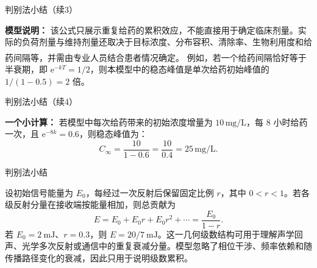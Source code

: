 \documentclass[aspectratio=169,10pt,fontset=fandol]{ctexbeamer}
\newcommand{\ee}{\mathrm{e}}
\newcommand{\upcite}[1]{\textsuperscript{\textsuperscript{\cite{#1}}}}
\begin{document}
\begin{frame}[t,fragile]{判别法小结（续3）}
\footnotesize
{\footnotesize
\begin{application}
\textbf{模型说明：} 该公式只展示重复给药的累积效应，不能直接用于确定临床剂量。实际的负荷剂量与维持剂量还取决于目标浓度、分布容积、清除率、生物利用度和给药间隔等，并需由专业人员结合患者情况确定。\upcite{NCBISteadyState} 例如，若一个给药间隔恰好等于半衰期，即 \(\ee^{-kT}=1/2\)，则本模型中的稳态峰值是单次给药初始峰值的 \(1/(1-0.5)=2\) 倍。


\end{application}
}
\end{frame}
\begin{frame}[t,fragile]{判别法小结（续4）}
\footnotesize
{\footnotesize
\begin{application}
\textbf{一个小计算：} 若模型中每次给药带来的初始浓度增量为 \(10\,\text{mg/L}\)，每 8 小时给药一次，且 \(\ee^{-8k}=0.6\)，则稳态峰值为：
\[
C_{\infty} = \frac{10}{1 - 0.6} = \frac{10}{0.4} = 25\,\text{mg/L}.
\]
\end{application}
}
\end{frame}
\begin{frame}[t,fragile]{判别法小结}
\footnotesize
{\footnotesize
\begin{application}[工程：多次反射与信号衰减]
设初始信号能量为 $E_0$，每经过一次反射后保留固定比例 $r$，其中 $0<r<1$。若各级反射分量在接收端按能量相加，则总贡献为
\[
E=E_0+E_0r+E_0r^2+\cdots
=\frac{E_0}{1-r}.
\]
若 $E_0=2\ \mathrm{mJ}$、$r=0.3$，则 $E=20/7\ \mathrm{mJ}$。这一几何级数结构可用于理解声学回声、光学多次反射或通信中的重复衰减分量。模型忽略了相位干涉、频率依赖和随传播路径变化的衰减，因此只用于说明级数累积。
\end{application}
}
\end{frame}
\end{document}
